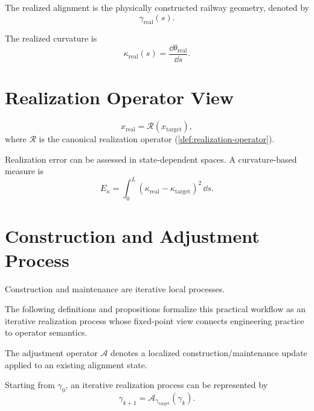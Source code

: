 \begin{definition}
\label{def:realized-alignment}
The realized alignment is the physically constructed railway geometry,
denoted by
\[
\gamma_{\mathrm{real}}(s).
\]
\end{definition}

\begin{definition}
\label{def:realized-curvature}
The realized curvature is
\[
\kappa_{\mathrm{real}}(s)=\frac{\dd\theta_{\mathrm{real}}}{\dd s}.
\]
\end{definition}

\section{Realization Operator View}

\[
x_{\mathrm{real}}=\mathcal R(x_{\mathrm{target}}),
\]
where \(\mathcal R\) is the canonical realization operator
(\cref{def:realization-operator}).

Realization error can be assessed in state-dependent spaces. A
curvature-based measure is
\[
E_{\kappa}
=
\int_0^L\left(\kappa_{\mathrm{real}}-\kappa_{\mathrm{target}}\right)^2\,\dd s.
\]

\section{Construction and Adjustment Process}

Construction and maintenance are iterative local processes.

The following definitions and propositions formalize this practical
workflow as an iterative realization process whose fixed-point view
connects engineering practice to operator semantics.

\begin{definition}
\label{def:adjustment-operator}
The adjustment operator \(\mathcal A\) denotes a localized
construction/maintenance update applied to an existing alignment state.
\end{definition}

\begin{definition}
\label{def:iterative-construction-realization}
Starting from \(\gamma_0\), an iterative realization process can be
represented by
\[
\gamma_{k+1}=\mathcal A_{\gamma_{\mathrm{target}}}(\gamma_k).
\]
\end{definition}

